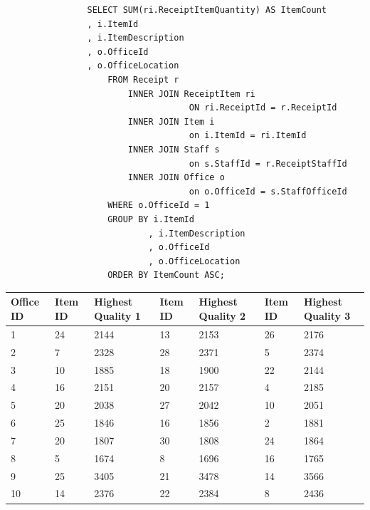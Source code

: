 \documentclass{article}
\begin{document}
            \begin{lstlisting}
                SELECT SUM(ri.ReceiptItemQuantity) AS ItemCount
                , i.ItemId
                , i.ItemDescription
                , o.OfficeId
                , o.OfficeLocation
                    FROM Receipt r
                        INNER JOIN ReceiptItem ri
                                    ON ri.ReceiptId = r.ReceiptId
                        INNER JOIN Item i
                                    on i.ItemId = ri.ItemId
                        INNER JOIN Staff s
                                    on s.StaffId = r.ReceiptStaffId
                        INNER JOIN Office o
                                    on o.OfficeId = s.StaffOfficeId
                    WHERE o.OfficeId = 1
                    GROUP BY i.ItemId
                            , i.ItemDescription
                            , o.OfficeId
                            , o.OfficeLocation
                    ORDER BY ItemCount ASC;
            \end{lstlisting}

            \begin{table}[H]
                \centering
                \begin{tabular}{|l|l|l|l|l|l|l|}
                \hline
                Office ID & Item ID & Highest Quality 1 & Item ID & Highest Quality 2 & Item ID & Highest Quality 3  \\ \hline
                1         & 24      & 2144              & 13      & 2153              & 26      & 2176               \\ \hline
                2         & 7       & 2328              & 28      & 2371              & 5       & 2374               \\ \hline
                3         & 10      & 1885              & 18      & 1900              & 22      & 2144               \\ \hline
                4         & 16      & 2151              & 20      & 2157              & 4       & 2185               \\ \hline
                5         & 20      & 2038              & 27      & 2042              & 10      & 2051               \\ \hline
                6         & 25      & 1846              & 16      & 1856              & 2       & 1881               \\ \hline
                7         & 20      & 1807              & 30      & 1808              & 24      & 1864               \\ \hline
                8         & 5       & 1674              & 8       & 1696              & 16      & 1765               \\ \hline
                9         & 25      & 3405              & 21      & 3478              & 14      & 3566               \\ \hline
                10        & 14      & 2376              & 22      & 2384              & 8       & 2436               \\ \hline
                \end{tabular}
                \end{table}
\end{document}
